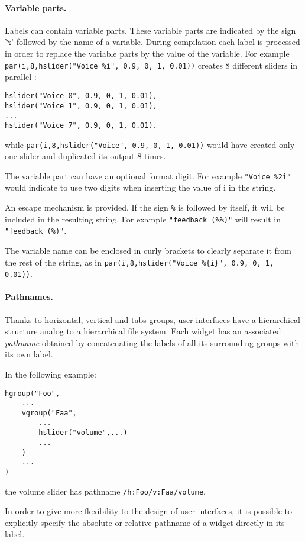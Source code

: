 \paragraph{Variable parts.}
Labels can contain variable parts. These variable parts are indicated by the sign '\texttt{\%}' followed by the name of a variable. During compilation each label is processed in order to replace the variable parts by the value of the variable.
For example \lstinline'par(i,8,hslider("Voice %i", 0.9, 0, 1, 0.01))' creates 8 different sliders in parallel :

\begin{lstlisting}
hslider("Voice 0", 0.9, 0, 1, 0.01),
hslider("Voice 1", 0.9, 0, 1, 0.01),
...
hslider("Voice 7", 0.9, 0, 1, 0.01).
\end{lstlisting}

while \lstinline'par(i,8,hslider("Voice", 0.9, 0, 1, 0.01))' would have created only one slider and duplicated its output 8 times.

The variable part can have an optional format digit.
For example \lstinline'"Voice %2i"' would indicate to use two digits when inserting the value of i in the string.

An escape mechanism is provided.
If the sign \lstinline'%' is followed by itself, it will be included in the resulting string.
For example \lstinline'"feedback (%%)"' will result in \lstinline'"feedback (%)"'.

The variable name can be enclosed in curly brackets to clearly separate it from the rest of the string, as in \lstinline'par(i,8,hslider("Voice %{i}", 0.9, 0, 1, 0.01))'.



\paragraph{Pathnames.}
Thanks to horizontal, vertical and tabs groups, user interfaces have a hierarchical structure analog to a hierarchical file system. Each widget has an associated \textit{pathname} obtained by concatenating the labels of all its surrounding groups with its own label.

In the following example:
\begin{lstlisting}
hgroup("Foo",
	...
	vgroup("Faa", 
		...
		hslider("volume",...)
		...
	)
	...
)
\end{lstlisting}
the volume slider has pathname \lstinline'/h:Foo/v:Faa/volume'.

In order to give more flexibility to the design of user interfaces, it is possible to explicitly specify the absolute or relative pathname of a widget directly in its label.

